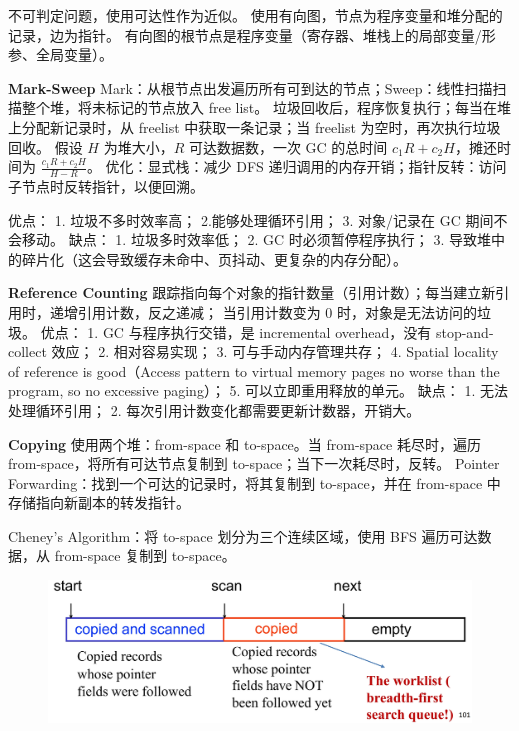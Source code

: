 \par \noindent 不可判定问题，使用可达性作为近似。
使用有向图，节点为程序变量和堆分配的记录，边为指针。
有向图的根节点是程序变量（寄存器、堆栈上的局部变量/形参、全局变量）。

\par \noindent \textbf{Mark-Sweep} Mark：从根节点出发遍历所有可到达的节点；Sweep：线性扫描扫描整个堆，将未标记的节点放入 free list。
垃圾回收后，程序恢复执行；每当在堆上分配新记录时，从 freelist 中获取一条记录；当 freelist 为空时，再次执行垃圾回收。
假设 $H$ 为堆大小，$R$ 可达数据数，一次 GC 的总时间 $c_1 R + c_2 H$，摊还时间为 $\frac{c_1 R + c_2 H}{H - R}$。
优化：显式栈：减少 DFS 递归调用的内存开销；指针反转：访问子节点时反转指针，以便回溯。
\par \noindent 优点：
1. 垃圾不多时效率高；
2.能够处理循环引用；
3. 对象/记录在 GC 期间不会移动。
缺点：
1. 垃圾多时效率低；
2. GC 时必须暂停程序执行；
3. 导致堆中的碎片化（这会导致缓存未命中、页抖动、更复杂的内存分配）。

\par \noindent \textbf{Reference Counting} 跟踪指向每个对象的指针数量（引用计数）；每当建立新引用时，递增引用计数，反之递减；
当引用计数变为 0 时，对象是无法访问的垃圾。
优点：
1. GC 与程序执行交错，是 incremental overhead，没有 stop-and-collect 效应；
2. 相对容易实现；
3. 可与手动内存管理共存；
4. Spatial locality of reference is good（Access pattern to virtual memory pages no worse than the program, so no excessive paging）；
5. 可以立即重用释放的单元。
缺点：
1. 无法处理循环引用；
2. 每次引用计数变化都需要更新计数器，开销大。

\par \noindent \textbf{Copying} 使用两个堆：from-space 和 to-space。当 from-space 耗尽时，遍历 from-space，将所有可达节点复制到 to-space；当下一次耗尽时，反转。
Pointer Forwarding：找到一个可达的记录时，将其复制到 to-space，并在 from-space 中存储指向新副本的转发指针。
\par \noindent Cheney’s Algorithm：将 to-space 划分为三个连续区域，使用 BFS 遍历可达数据，从 from-space 复制到 to-space。

\begin{figure}[H]
    \centering
    \includegraphics[width=0.8\linewidth]{figures/gc1.png}
\end{figure}

